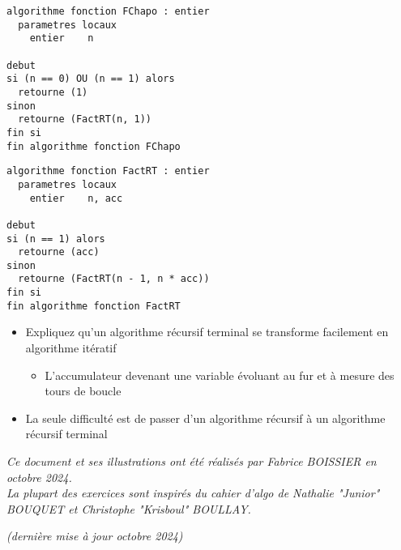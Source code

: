 \documentclass[11pt,a4paper]{article}
\begin{document}
\begin{table}[!ht]
  \centering
  \begin{minipage}{0.478\textwidth}
    \centering
\begin{lstlisting}[style=algorithmique]
algorithme fonction FChapo : entier
  parametres locaux
    entier    n

debut
si (n == 0) OU (n == 1) alors
  retourne (1)
sinon
  retourne (FactRT(n, 1))
fin si
fin algorithme fonction FChapo \end{lstlisting}
  \end{minipage}
  \hfillx
  \begin{minipage}{0.48\textwidth}
    \centering
\begin{lstlisting}[style=algorithmique]
algorithme fonction FactRT : entier
  parametres locaux
    entier    n, acc

debut
si (n == 1) alors
  retourne (acc)
sinon
  retourne (FactRT(n - 1, n * acc))
fin si
fin algorithme fonction FactRT \end{lstlisting}
  \end{minipage}
\end{table}

\begin{itemize}
\item Expliquez qu'un algorithme récursif terminal se transforme facilement en algorithme itératif
  \begin{itemize}[label=$\bullet$]
  \item L'accumulateur devenant une variable évoluant au fur et à mesure des tours de boucle
  \end{itemize}
\item La seule difficulté est de passer d'un algorithme récursif à un algorithme récursif terminal
\end{itemize}

\bigskip



\vfillFirst

\vfillLast


\begin{center}
\textit{Ce document et ses illustrations ont été réalisés par Fabrice BOISSIER en octobre 2024.\\
La plupart des exercices sont inspirés du cahier d'algo de Nathalie "Junior" BOUQUET et Christophe "Krisboul" BOULLAY.}

\textit{(dernière mise à jour octobre 2024)}
\end{center}
\end{document}
